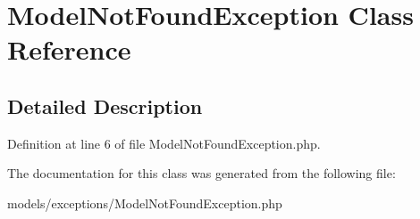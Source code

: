 \hypertarget{class_model_not_found_exception}{
\section{ModelNotFoundException Class Reference}
\label{class_model_not_found_exception}
}


\subsection{Detailed Description}


Definition at line 6 of file ModelNotFoundException.php.



The documentation for this class was generated from the following file:\begin{DoxyCompactItemize}
\item 
models/exceptions/ModelNotFoundException.php\end{DoxyCompactItemize}
